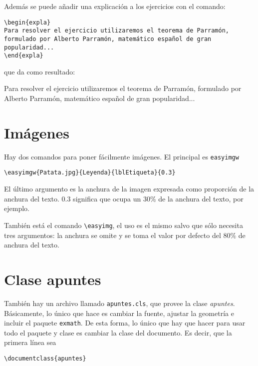 \documentclass[nochap]{apuntes}
\begin{document}
 Además se puede añadir una explicación a los ejercicios con el comando:
\begin{verbatim}
\begin{expla}
Para resolver el ejercicio utilizaremos el teorema de Parramón, formulado por Alberto Parramón, matemático español de gran popularidad...
\end{expla}
\end{verbatim}

 que da como resultado:
\begin{expla}
Para resolver el ejercicio utilizaremos el teorema de Parramón, formulado por Alberto Parramón, matemático español de gran popularidad...
\end{expla}

\section{Imágenes}

Hay dos comandos para poner fácilmente imágenes. El principal es \texttt{easyimgw}

\begin{verbatim}
\easyimgw{Patata.jpg}{Leyenda}{lblEtiqueta}{0.3}
\end{verbatim}

El último argumento es la anchura de la imagen expresada como proporción de la anchura del texto. $0.3$ significa que ocupa un $30\%$ de la anchura del texto, por ejemplo.


También está el comando \verb|\easyimg|, el uso es el mismo salvo que sólo necesita tres argumentos: la anchura se omite y se toma el valor por defecto del $80\%$ de anchura del texto.

 \section{Clase apuntes}

 También hay un archivo llamado \texttt{apuntes.cls}, que provee la clase \textit{apuntes}. Básicamente, lo único que hace es cambiar la fuente, ajustar la geometría e incluir el paquete \texttt{exmath}. De esta forma, lo único que hay que hacer para usar todo el paquete y clase es cambiar la clase del documento. Es decir, que la primera línea sea

\begin{verbatim}
\documentclass{apuntes}
\end{verbatim}
\end{document}
